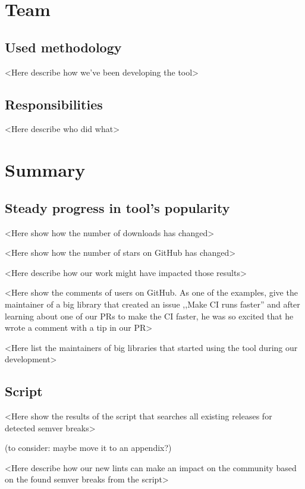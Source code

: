 \documentclass[licencjacka,en]{pracamgr}
\begin{document}
\chapter{Team}\label{r:team}

\section{Used methodology}

<Here describe how we've been developing the tool>


\section{Responsibilities}

<Here describe who did what>



\chapter{Summary}\label{r:summary}

\section{Steady progress in tool's popularity}

<Here show how the number of downloads has changed>

<Here show how the number of stars on GitHub has changed>

<Here describe how our work might have impacted those results>

<Here show the comments of users on GitHub.
As one of the examples, give the maintainer of a big
library that created an issue ,,Make CI runs faster''
and after learning about one of our PRs to make the CI faster,
he was so excited that he wrote a comment with a tip in our PR>

<Here list the maintainers of big libraries that started using the tool during our development>


\section{Script}

<Here show the results of the script that searches all existing releases for detected semver breaks>

(to consider: maybe move it to an appendix?)

<Here describe how our new lints can make an impact on the community based on the found semver breaks from the script>
\end{document}
